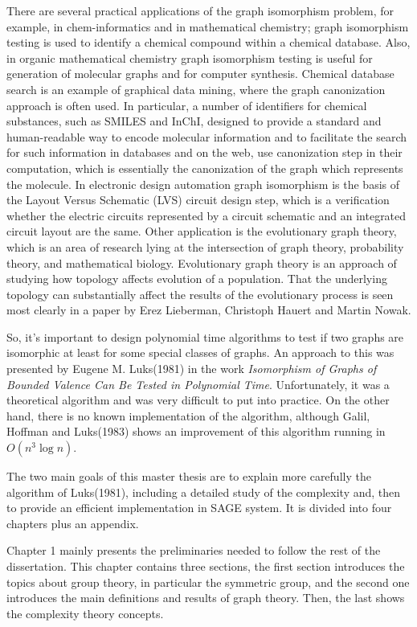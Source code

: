 \documentclass[12pt,a4paper]{book}
\theoremstyle{plain}
\theoremstyle{definition}
\theoremstyle{remark}
\begin{document}
  
There are several practical applications of the graph isomorphism problem, for example, in chem-informatics and in mathematical chemistry; 
graph isomorphism testing is used to identify a chemical compound within a chemical database. Also, in organic mathematical 
chemistry graph isomorphism testing is useful for generation of molecular graphs and for computer synthesis. Chemical database 
search is an example of graphical data mining, where the graph canonization approach is often used. In particular, a number 
of identifiers for chemical substances, such as SMILES and InChI, designed to provide a standard and human-readable way to 
encode molecular information and to facilitate the search for such information in databases and on the web, use canonization 
step in their computation, which is essentially the canonization of the graph which represents the molecule.
In electronic design automation graph isomorphism is the basis of the Layout Versus Schematic (LVS) circuit design step, 
which is a verification whether the electric circuits represented by a circuit schematic and an integrated circuit layout 
are the same. Other application is the evolutionary graph theory, which is an area of research lying at the intersection of 
graph theory, probability theory, and mathematical biology. Evolutionary graph theory is an approach of studying how 
topology affects evolution of a population. That the underlying topology can substantially affect the results of the 
evolutionary process is seen most clearly in a paper by Erez Lieberman, Christoph Hauert and Martin Nowak.

So, it's important to design polynomial time algorithms to test if two graphs are isomorphic at least for some special classes of graphs. 
 An approach 
to this was  presented by Eugene M. Luks(1981) in the work \textit{Isomorphism of Graphs of Bounded Valence Can Be Tested in Polynomial 
Time}. Unfortunately,  it was a theoretical algorithm and was very difficult to put into practice.  
On the other hand, there is no known implementation of the algorithm, although Galil, Hoffman and Luks(1983) shows an improvement of 
this algorithm running  in $O(n^3 \log n)$. 

The two main goals of this  master thesis are to  explain more carefully the algorithm of Luks(1981), 
including a detailed study of  the complexity and, then to provide an efficient implementation in SAGE system.
It is divided into four chapters plus an appendix. 

Chapter 1 mainly presents the preliminaries needed to follow the rest of the dissertation. This chapter contains three sections, the first 
section introduces the topics about group theory, in particular  the symmetric group, and the second  one
introduces the main definitions and results  of graph theory. Then,  the last shows the 
complexity theory  concepts.
\end{document}
